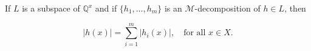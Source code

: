 If $L$ is a subspace of $\mathbb{Q}^x$ and if $\{h_1, \ldots, h_m\}$ is an $\mathcal{M}$-decomposition of $h \in L$, then

$$|h(x)| = \sum_{i=1}^{m} |h_i(x)|, \quad \text{for all } x \in X.$$
